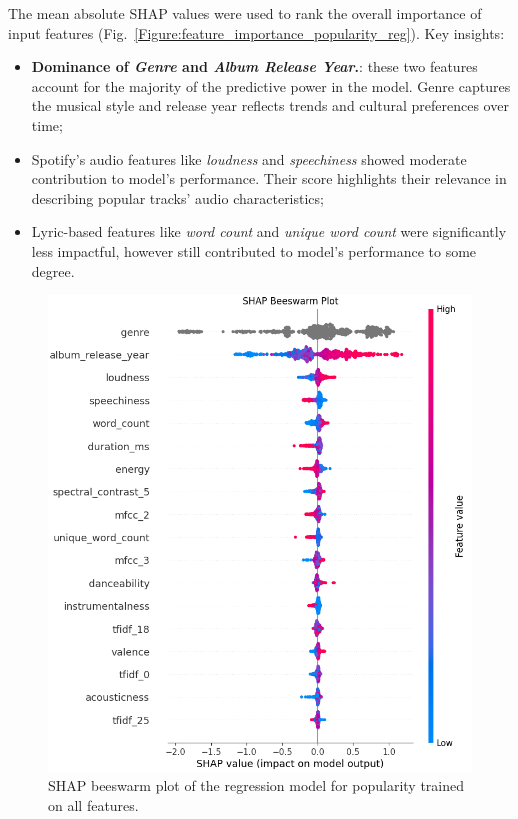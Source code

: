 The mean absolute SHAP values were used to rank the overall importance of input
features (Fig.~\ref{Figure:feature_importance_popularity_reg}). Key insights:
\begin{itemize}
  \item \textbf{Dominance of \textit{Genre} and \textit{Album Release Year}.}:
    these two features account for the majority of the predictive power in the
    model. Genre captures the musical style and release year reflects trends
    and cultural preferences over time;
  \item Spotify's audio features like \textit{loudness} and
    \textit{speechiness} showed moderate contribution to model's performance.
    Their score highlights their relevance in describing popular tracks' audio
    characteristics;
  \item Lyric-based features like \textit{word count} and \textit{unique word
    count} were significantly less impactful, however still contributed to
    model's performance to some degree.
\end{itemize}

\begin{center}
\begin{figure}[H]
  \centering
  \includegraphics[width=6in]{img/beeswarm_popularity_reg.png}
  \caption{SHAP beeswarm plot of the regression model for popularity trained on all features.}
  \label{Figure:beeswarm_popularity_reg}
\end{figure}
\end{center}


